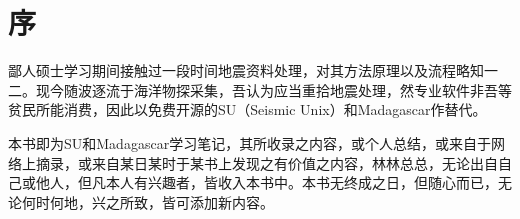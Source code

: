 \chapter*{序}
鄙人硕士学习期间接触过一段时间地震资料处理，对其方法原理以及流程略知一二。现今随波逐流于海洋物探采集，吾认为应当重拾地震处理，然专业软件非吾等贫民所能消费，因此以免费开源的SU（Seismic Unix）和Madagascar作替代。

本书即为SU和Madagascar学习笔记，其所收录之内容，或个人总结，或来自于网络上摘录，或来自某日某时于某书上发现之有价值之内容，林林总总，无论出自自己或他人，但凡本人有兴趣者，皆收入本书中。本书无终成之日，但随心而已，无论何时何地，兴之所致，皆可添加新内容。